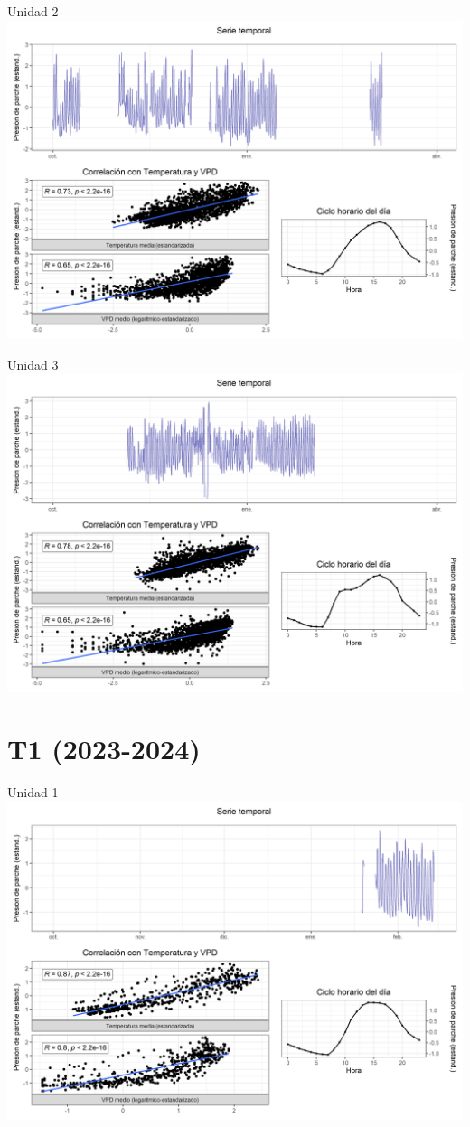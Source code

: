 \documentclass[
  letterpaper,
  DIV=11,
  numbers=noendperiod]{scrreprt}
\begin{document}
Unidad 2
\includegraphics{figuras/04_turgor_unidad/2022_2023_Rio_Claro_T4_Unidad_2.png}

Unidad 3
\includegraphics{figuras/04_turgor_unidad/2022_2023_Rio_Claro_T4_Unidad_3.png}

\chapter{T1 (2023-2024)}

Unidad 1
\includegraphics{figuras/04_turgor_unidad/2023_2024_Rio_Claro_T1_Unidad_1.png}
\end{document}
